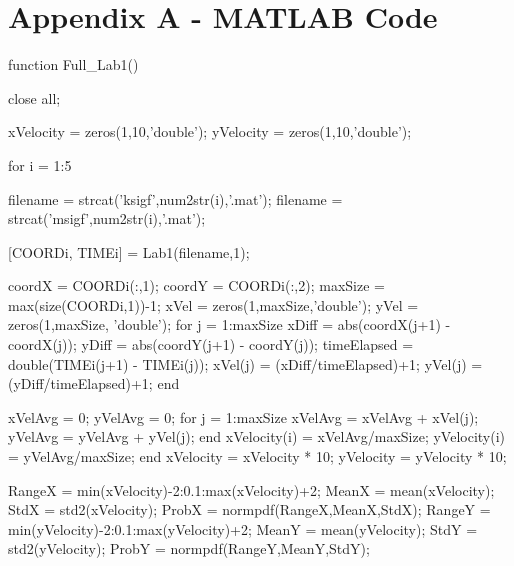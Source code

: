 \documentclass[a4paper]{article}
\begin{document}
\section{Appendix A - MATLAB Code}
\begin{MATLAB}
function Full_Lab1()
%
%
%

close all;

xVelocity = zeros(1,10,'double');
yVelocity = zeros(1,10,'double');

%

for i = 1:5
    
    
    filename = strcat('ksigf',num2str(i),'.mat');
    filename = strcat('msigf',num2str(i),'.mat');
    
    [COORDi, TIMEi] = Lab1(filename,1);
    
    coordX = COORDi(:,1);
    coordY = COORDi(:,2);
    maxSize = max(size(COORDi,1))-1;
    xVel = zeros(1,maxSize,'double');
    yVel = zeros(1,maxSize, 'double');
    for j = 1:maxSize
        xDiff = abs(coordX(j+1) - coordX(j));
        yDiff = abs(coordY(j+1) - coordY(j));
        timeElapsed = double(TIMEi(j+1) - TIMEi(j));
        xVel(j) = (xDiff/timeElapsed)+1;
        yVel(j) = (yDiff/timeElapsed)+1;
    end
    
    xVelAvg = 0;
    yVelAvg = 0;
    for j = 1:maxSize
        xVelAvg = xVelAvg + xVel(j);
        yVelAvg = yVelAvg + yVel(j);
    end
    xVelocity(i) = xVelAvg/maxSize;
    yVelocity(i) = yVelAvg/maxSize;
end
xVelocity = xVelocity * 10;
yVelocity = yVelocity * 10;

RangeX = min(xVelocity)-2:0.1:max(xVelocity)+2;
MeanX = mean(xVelocity);
StdX = std2(xVelocity);
ProbX = normpdf(RangeX,MeanX,StdX);
RangeY = min(yVelocity)-2:0.1:max(yVelocity)+2;
MeanY = mean(yVelocity);
StdY = std2(yVelocity);
ProbY = normpdf(RangeY,MeanY,StdY);


\end{MATLAB}
\end{document}
